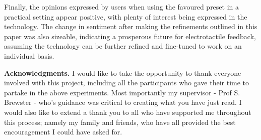 \documentclass{mpaper}
\begin{document}
Finally, the opinions expressed by users when using the favoured preset in a practical setting appear positive, with plenty of interest being expressed in the technology. The change in sentiment after making the refinements outlined in this paper was also sizeable, indicating a prosperous future for electrotactile feedback, assuming the technology can be further refined and fine-tuned to work on an individual basis.

\vskip8pt \noindent
{\bf Acknowledgments.}
I would like to take the opportunity to thank everyone involved with this project, including all the participants who gave their time to partake in the above experiments. Most importantly my supervisor - Prof S. Brewster - who's guidance was critical to creating what you have just read. I would also like to extend a thank you to all who have supported me throughout this process; namely my family and friends, who have all provided the best encouragement I could have asked for.



\end{document}
